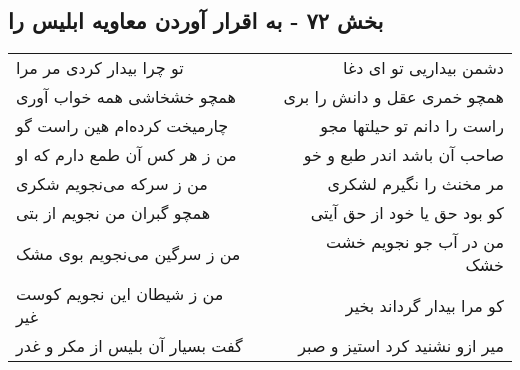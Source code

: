 \begin{center}
\section*{بخش ۷۲ - به اقرار آوردن معاویه ابلیس را}
\label{sec:sh072}
\begin{longtable}{l p{0.5cm} r}
تو چرا بیدار کردی مر مرا
&&
دشمن بیداریی تو ای دغا
\\
همچو خشخاشی همه خواب آوری
&&
همچو خمری عقل و دانش را بری
\\
چارمیخت کرده‌ام هین راست گو
&&
راست را دانم تو حیلتها مجو
\\
من ز هر کس آن طمع دارم که او
&&
صاحب آن باشد اندر طبع و خو
\\
من ز سرکه می‌نجویم شکری
&&
مر مخنث را نگیرم لشکری
\\
همچو گبران من نجویم از بتی
&&
کو بود حق یا خود از حق آیتی
\\
من ز سرگین می‌نجویم بوی مشک
&&
من در آب جو نجویم خشت خشک
\\
من ز شیطان این نجویم کوست غیر
&&
کو مرا بیدار گرداند بخیر
\\
گفت بسیار آن بلیس از مکر و غدر
&&
میر ازو نشنید کرد استیز و صبر
\\
\end{longtable}
\end{center}
